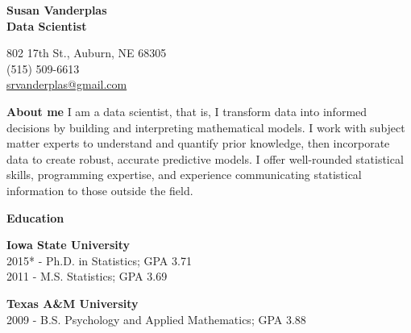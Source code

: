 \documentclass[letterpaper,12pt,final]{memoir}
\newcommand{\MedSep}{\vspace{1em}}
\newcommand{\SmallSep}{\vspace{0.5em}}
\newenvironment{AboutMe}
	{\ignorespaces\textbf{\color{RoyalBlue} About me}}
	{\MedSep\ignorespacesafterend}
\newcommand{\CVSection}[1]
	{\Large\textbf{#1}\par
	\SmallSep\normalsize\normalfont}
\newcommand{\CVItem}[1]
	{\textbf{\color{RoyalBlue} #1}}
\begin{document}



\begin{minipage}[t]{.6\linewidth}
\Huge\bfseries {\color{RoyalBlue} Susan Vanderplas} \\
\Large\bfseries  Data Scientist 
\end{minipage}\hfill
\begin{minipage}[t]{.35\linewidth}
\begin{flushright}\small
\phantom{\Huge SVP}
802 17th St., Auburn, NE 68305 \\
(515) 509-6613\\
\url{srvanderplas@gmail.com} 
\end{flushright}
\end{minipage}

\normalsize\normalfont
\SmallSep
\begin{AboutMe}
I am a data scientist, that is, I transform data into informed decisions by building and interpreting mathematical models. 
I work with subject matter experts to understand and quantify prior knowledge, then incorporate data to create robust, accurate predictive models. 
I offer well-rounded statistical skills, programming expertise, and experience communicating statistical information to those outside the field. 
\end{AboutMe}

\CVSection{Education}
\CVItem{Iowa State University}\\
2015* - Ph.D. in Statistics; GPA 3.71\\
2011 - M.S. Statistics; GPA 3.69
\SmallSep

\CVItem{Texas A\&M University}\\
2009 - B.S. Psychology and Applied Mathematics; GPA 3.88
\MedSep
\end{document}
